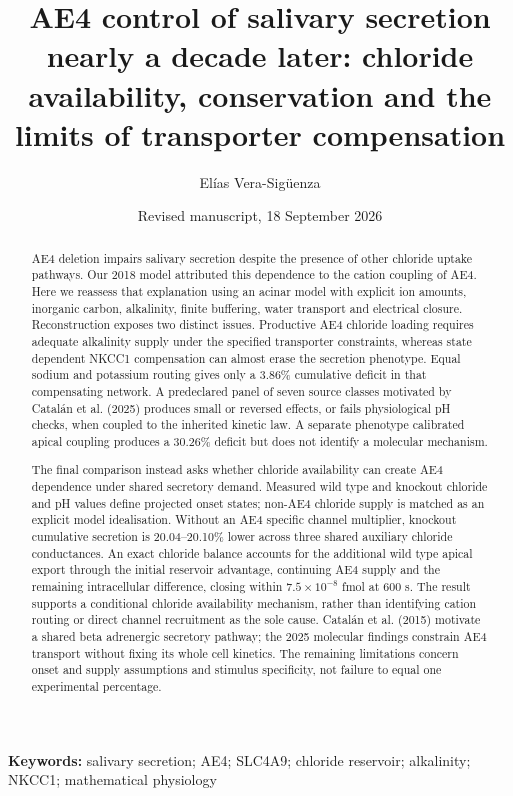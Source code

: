 \documentclass[11pt]{article}
\title{AE4 control of salivary secretion nearly a decade later: chloride availability, conservation and the limits of transporter compensation}
\author{Elías Vera-Sigüenza}
\date{Revised manuscript, 18 September 2026}
\begin{document}
\maketitle

\begin{abstract}
AE4 deletion impairs salivary secretion despite the presence of other chloride uptake pathways. Our 2018 model attributed this dependence to the cation coupling of AE4. Here we reassess that explanation using an acinar model with explicit ion amounts, inorganic carbon, alkalinity, finite buffering, water transport and electrical closure. Reconstruction exposes two distinct issues. Productive AE4 chloride loading requires adequate alkalinity supply under the specified transporter constraints, whereas state dependent NKCC1 compensation can almost erase the secretion phenotype. Equal sodium and potassium routing gives only a 3.86\% cumulative deficit in that compensating network. A predeclared panel of seven source classes motivated by Catalán et al. (2025) produces small or reversed effects, or fails physiological pH checks, when coupled to the inherited kinetic law. A separate phenotype calibrated apical coupling produces a 30.26\% deficit but does not identify a molecular mechanism.

The final comparison instead asks whether chloride availability can create AE4 dependence under shared secretory demand. Measured wild type and knockout chloride and pH values define projected onset states; non-AE4 chloride supply is matched as an explicit model idealisation. Without an AE4 specific channel multiplier, knockout cumulative secretion is 20.04--20.10\% lower across three shared auxiliary chloride conductances. An exact chloride balance accounts for the additional wild type apical export through the initial reservoir advantage, continuing AE4 supply and the remaining intracellular difference, closing within $7.5\times10^{-8}$ fmol at 600 s. The result supports a conditional chloride availability mechanism, rather than identifying cation routing or direct channel recruitment as the sole cause. Catalán et al. (2015) motivate a shared beta adrenergic secretory pathway; the 2025 molecular findings constrain AE4 transport without fixing its whole cell kinetics. The remaining limitations concern onset and supply assumptions and stimulus specificity, not failure to equal one experimental percentage.
\end{abstract}

\noindent\textbf{Keywords:} salivary secretion; AE4; SLC4A9; chloride reservoir; alkalinity; NKCC1; mathematical physiology
\end{document}
